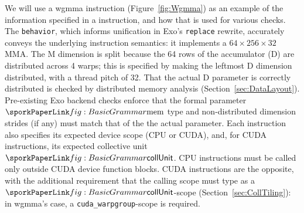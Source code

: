 
We will use a wgmma instruction (Figure~\ref{fig:Wgmma})
as an example of the information specified in a \sporkName{} instruction,
and how that is used for various checks.
The \texttt{behavior}, which informs unification in Exo's \texttt{replace} rewrite,
accurately conveys the underlying instruction semantics:
it implements a $64\times256\times32$ MMA.
The M dimension is split because the 64 rows of the accumulator (D)
are distributed across 4 warps; this is specified by making the leftmost
D dimension distributed, with a thread pitch of 32.
That the actual D parameter is correctly distributed is checked by distributed memory analysis (Section~\ref{sec:DataLayout}).
Pre-existing Exo backend checks enforce that the formal parameter $\sporkmem$ type and
non-distributed dimension strides (if any) must match that of the the actual parameter.
Each instruction also specifies its expected device scope (CPU or CUDA),
and, for CUDA instructions, its expected collective unit $\sporkcollUnit$.
CPU instructions must be called only outside CUDA device function blocks.
CUDA instructions are the opposite,
with the additional requirement that the calling scope must type as a
$\sporkcollUnit$-scope (Section~\ref{sec:CollTiling}):
in wgmma's case, a \texttt{cuda\_warpgroup}-scope is required.






